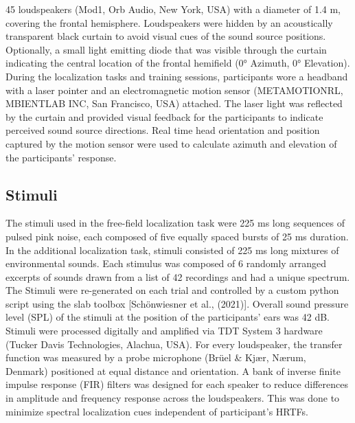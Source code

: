 45 loudspeakers (Mod1, Orb Audio, New York, USA) with a diameter of 1.4 m, covering the frontal hemisphere. Loudspeakers were hidden by an acoustically transparent black curtain to avoid visual cues of the sound source positions. Optionally, a small light emitting diode that was visible through the curtain indicating the central location of the frontal hemifield (0° Azimuth, 0° Elevation). During the localization tasks and training sessions, participants wore a headband with a laser pointer and an electromagnetic motion sensor (METAMOTIONRL, MBIENTLAB INC, San Francisco, USA) attached. The laser light was reflected by the curtain and provided visual feedback for the participants to indicate perceived sound source directions. Real time head orientation and position captured by the motion sensor were used to calculate azimuth and elevation of the participants’ response.
\subsection{Stimuli}
The stimuli used in the free-field localization task were 225 ms long sequences of pulsed pink noise, each composed of five equally spaced bursts of 25 ms duration. In the additional localization task, stimuli consisted of 225 ms long mixtures of environmental sounds. Each stimulus was composed of 6 randomly arranged excerpts of sounds drawn from a list of 42 recordings and had a unique spectrum. The Stimuli were re-generated on each trial and controlled by a custom python script using the slab toolbox [Schönwiesner et al., (2021)]. Overall sound pressure level (SPL) of the stimuli at the position of the participants’ ears was 42 dB. Stimuli were processed digitally and amplified via TDT System 3 hardware (Tucker Davis Technologies, Alachua, USA). For every loudspeaker, the transfer function was measured by a probe microphone (Brüel & Kjær, Nærum, Denmark) positioned at equal distance and orientation. A bank of inverse finite impulse response (FIR) filters was designed for each speaker to reduce differences in amplitude and frequency response across the loudspeakers. This was done to minimize spectral localization cues independent of participant’s HRTFs. 
